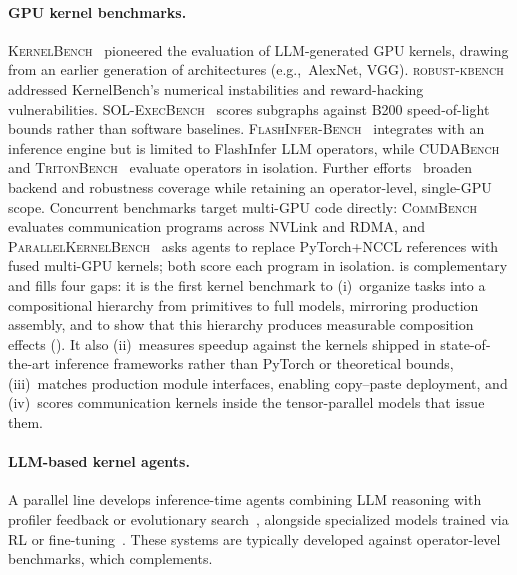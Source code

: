 \paragraph{GPU kernel benchmarks.}
\textsc{KernelBench}~\citep{kernelbench} pioneered the evaluation of LLM-generated GPU kernels, drawing from an earlier generation of architectures (e.g.,~AlexNet, VGG). \textsc{robust-kbench}~\citep{robustkbench} addressed KernelBench's numerical instabilities and reward-hacking vulnerabilities.
\textsc{SOL-ExecBench}~\citep{solexecbench} scores subgraphs against B200 speed-of-light bounds rather than software baselines.
\textsc{FlashInfer-Bench}~\citep{flashinferbench} integrates with an inference engine but is limited to FlashInfer LLM operators, while \textsc{CUDABench}~\citep{cudabench} and \textsc{TritonBench}~\citep{tritonbench} evaluate operators in isolation.
Further efforts~\citep{backendbench,multikernelbench,kernelcraft,nvidia2025computeeval,kalade2025npueval} broaden backend and robustness coverage while retaining an operator-level, single-GPU scope.
Concurrent benchmarks target multi-GPU code directly: \textsc{CommBench}~\citep{commbench} evaluates communication programs across NVLink and RDMA, and \textsc{ParallelKernelBench}~\citep{parallelkernelbench} asks agents to replace PyTorch+NCCL references with fused multi-GPU kernels; both score each program in isolation.
\FastKernels is complementary and fills four gaps: it is the first kernel benchmark to (i)~organize tasks into a compositional hierarchy from primitives to full models, mirroring production assembly, and to show that this hierarchy produces measurable composition effects (). It also (ii)~measures speedup against the kernels shipped in state-of-the-art inference frameworks rather than PyTorch or theoretical bounds, (iii)~matches production module interfaces, enabling copy--paste deployment, and (iv)~scores communication kernels inside the tensor-parallel models that issue them.

\paragraph{LLM-based kernel agents.}
A parallel line develops inference-time agents combining LLM reasoning with profiler feedback or evolutionary search~\citep{robustkbench,kernelagent,kernelevolve,wei2025astra,cudaforge,wang2025geak,alphaevolve,openevolve,kda,ako}, alongside specialized models trained via RL or fine-tuning~\citep{baronio2025kevin,li2025cudal1,kernelllm2025,li2025autotriton,zhu2026qimeng}. These systems are typically developed against operator-level benchmarks, which \FastKernels complements.

